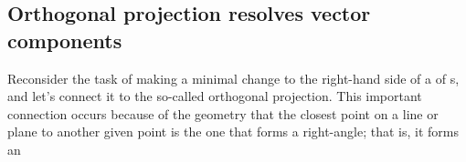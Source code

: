 %





\subsection{Orthogonal projection resolves vector components}
\label{sec:proj}


\begin{comment}
\cite[p.738]{HughesHallett2013} \pooliv{p.27--8}
onto a vector, parallel and perpendicular components, work done
\pooliv{p.382}
orthogonal projections onto subspace, orthogonal decomposition thm,
\end{comment}

Reconsider the task of making a minimal change to the right-hand side of a  of s, and let's connect it to the so-called orthogonal projection.
This important connection occurs because of the geometry that the closest point on a line or plane to another given point is the one that forms a right-angle; that is, it forms an 

